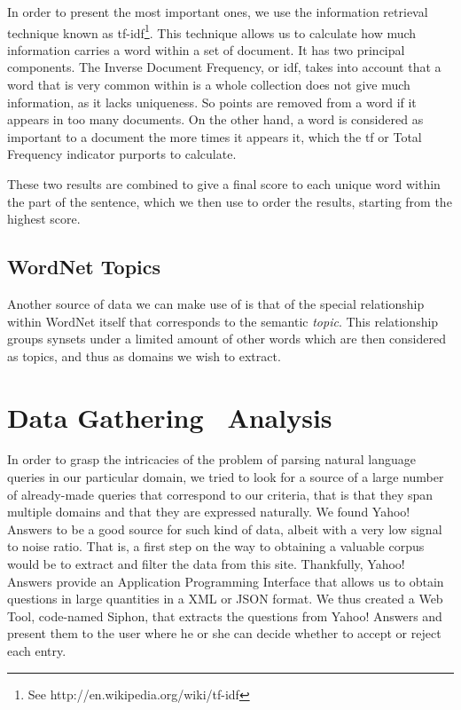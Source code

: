 In order to present the most important ones, we use the information retrieval technique known as tf-idf\footnote{See http://en.wikipedia.org/wiki/tf-idf}. This technique allows us to calculate how much information carries a word within a set of document. It has two principal components. The Inverse Document Frequency, or idf, takes into account that a word that is very common within is a whole collection does not give much information, as it lacks uniqueness. So points are removed from a word if it appears in too many documents. On the other hand, a word is considered as important to a document the more times it appears it, which the tf or Total Frequency indicator purports to calculate.

These two results are combined to give a final score to each unique word within the part of the sentence, which we then use to order the results, starting from the highest score.


\subsection{WordNet Topics} %
\label{sub:wordnet_topics}

Another source of data we can make use of is that of the special relationship within WordNet itself that corresponds to the semantic \emph{topic}. This relationship groups synsets under a limited amount of other words which are then considered as topics, and thus as domains we wish to extract.




\section{Data Gathering \amper\ Analysis} %
\label{sec:data_gathering_and_analysis}

In order to grasp the intricacies of the problem of parsing natural language queries in our particular domain, we tried to look for a source of a large number of already-made queries that correspond to our criteria, that is that they span multiple domains and that they are expressed naturally. We found Yahoo! Answers to be a good source for such kind of data, albeit with a very low signal to noise ratio. That is, a first step on the way to obtaining a valuable corpus would be to extract and filter the data from this site. Thankfully, Yahoo! Answers provide an Application Programming Interface that allows us to obtain questions in large quantities in a XML or JSON format. We thus created a Web Tool, code-named Siphon, that extracts the questions from Yahoo! Answers and present them to the user where he or she can decide whether to accept or reject each entry.

